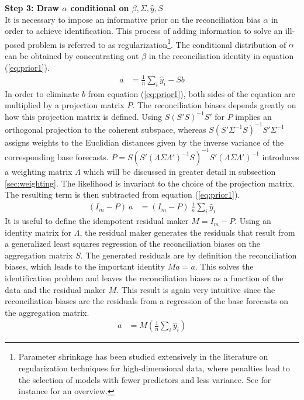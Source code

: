 \documentclass[a4paper,fleqn,11pt]{article}
\begin{document}
\noindent\textbf{Step 3: Draw $\alpha$ conditional on $\beta,\Sigma,\hat{y},S$}\\
It is necessary to impose an informative prior on the reconciliation bias $\alpha$ in order to achieve identification. This process of adding information to solve an ill-posed problem is referred to as regularization\footnote{Parameter shrinkage  has been studied extensively in the literature on regularization techniques for high-dimensional data, where penalties lead to the selection of models with fewer predictors and less variance. See for instance \cite{Polson2010} for an overview.}. The conditional distribution of $\alpha$  can be obtained by concentrating out $\beta$ in the reconciliation identity in equation (\ref{eq:prior1}).
\begin{align}
	\label{eq:prior1}
	a &= \frac{1}{n}\sum_i \hat{y}_i - Sb
\end{align}
In order to eliminate $b$ from equation (\ref{eq:prior1}), both sides of the equation are multiplied by a projection matrix $P$. The reconciliation biases depends greatly on how this projection matrix is defined. Using $S(S'S)^{-1}S'$ for $P$ implies an orthogonal projection to the coherent subspace, whereas $S(S'\Sigma^{-1}S)^{-1}S'\Sigma^{-1}$ assigns weights to the Euclidian distances given by the inverse variance of the corresponding base forecasts. $P= S(S'(\Lambda\Sigma\Lambda')^{-1}S)^{-1}S'(\Lambda\Sigma\Lambda')^{-1}$ introduces a weighting matrix $\Lambda$ which will be discussed in greater detail in subsection \ref{sec:weighting}. The likelihood is invariant to the choice of the projection matrix. The resulting term is then subtracted from equation (\ref{eq:prior1}).
\begin{align}
	\label{eq:prior2}
	(I_m - P)\ a &= (I_m - P)\ \frac{1}{n}\sum_i \hat{y}_i  
\end{align}
It is useful to define the idempotent residual maker $M = I_m - P$. Using an identity matrix for $\Lambda$, the residual maker generates the residuals that result from a generalized least squares regression of the reconciliation biases on the aggregation matrix $S$. The generated residuals are by definition the reconciliation biases, which leads to the important identity $Ma = a$. This solves the identification problem and leaves the reconciliation biases as a function of the data and the residual maker $M$. This result is again very intuitive since the reconciliation biases are the residuals from a regression of the base forecasts on the aggregation matrix.
\begin{align}
a &= M\left(\frac{1}{n}\sum_i \hat{y}_i\right)
\end{align}
\end{document}
